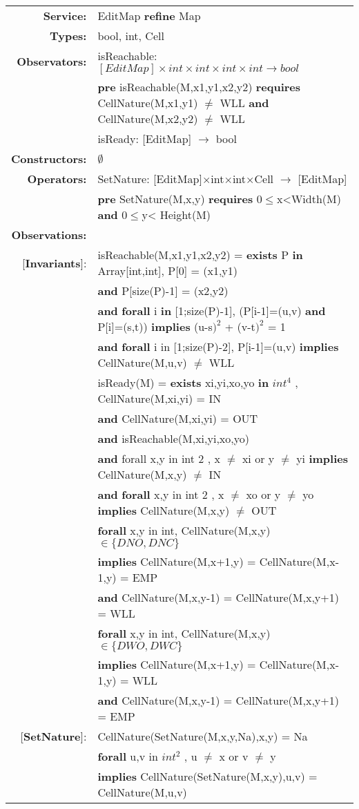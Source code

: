 
\begin{tabular}{rl}
\textbf{Service:}&	EditMap \textbf{refine} Map\\
\textbf{Types:}&	bool, int, Cell\\
\textbf{Observators:} &
isReachable: $[EditMap] \times int \times int \times int \times int \rightarrow bool$\\
& \quad\textbf{pre} isReachable(M,x1,y1,x2,y2) \textbf{requires} CellNature(M,x1,y1) $\neq$ WLL \textbf{and} CellNature(M,x2,y2) $\neq$ WLL\\
&
isReady: [EditMap] $\rightarrow$ bool\\
\textbf{Constructors:} & $\emptyset$\\
\textbf{Operators:} &
SetNature: [EditMap]$\times$int$\times$int$\times$Cell $\rightarrow$ [EditMap]\\
& \quad\textbf{pre} SetNature(M,x,y) \textbf{requires} 0$\leq$x<Width(M) \textbf{and} 0$\leq$y< Height(M)\\


\textbf{Observations:}\\

[\textbf{Invariants}]: & isReachable(M,x1,y1,x2,y2) = \textbf{exists} P \textbf{in} Array[int,int], P[0] = (x1,y1)\\&
\quad\textbf{and} P[size(P)-1] = (x2,y2)\\
& 
\quad\textbf{and} \textbf{forall} i \textbf{in} [1;size(P)-1], (P[i-1]=(u,v) \textbf{and} P[i]=(s,t)) \textbf{implies} (u-s$ )^2$ + (v-t$)^2$ = 1\\
&
\quad\textbf{and} \textbf{forall} i in [1;size(P)-2], P[i-1]=(u,v) \textbf{implies} CellNature(M,u,v) $\neq$ WLL\\
&
isReady(M) = \textbf{exists} xi,yi,xo,yo \textbf{in} $int^4$ ,
CellNature(M,xi,yi) = IN \\
&
\quad\textbf{and} CellNature(M,xi,yi) = OUT\\
&
\quad\textbf{and} isReachable(M,xi,yi,xo,yo)\\
&
\quad\textbf{and} forall x,y in int 2 , x $\neq$ xi or y $\neq$ yi \textbf{implies} CellNature(M,x,y) $\neq$ IN\\
&
\quad\textbf{and} \textbf{forall} x,y in int 2 , x $\neq$ xo or y $\neq$ yo \textbf{implies} CellNature(M,x,y) $\neq$ OUT\\
&
\quad\textbf{forall} x,y in int, CellNature(M,x,y) $\in \{ DNO, DNC\}$\\
&
\quad\quad\textbf{implies} CellNature(M,x+1,y) = CellNature(M,x-1,y) = EMP\\
&
\quad \textbf{and} CellNature(M,x,y-1) = CellNature(M,x,y+1) = WLL\\
&
\quad\textbf{forall} x,y in int, CellNature(M,x,y) $\in \{ DWO, DWC\}$ \\
& \quad\quad\textbf{implies} CellNature(M,x+1,y) = CellNature(M,x-1,y) = WLL \\
&
\quad\textbf{and} CellNature(M,x,y-1) = CellNature(M,x,y+1) = EMP\\

[\textbf{SetNature}]: &
CellNature(SetNature(M,x,y,Na),x,y) = Na\\
& \quad\textbf{forall} u,v in $int^2$ , u $\neq$ x or v $\neq$ y\\
&
\quad\quad \textbf{implies} CellNature(SetNature(M,x,y),u,v) = CellNature(M,u,v)\\
\end{tabular}

